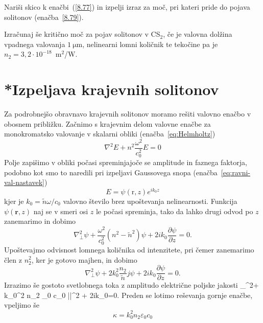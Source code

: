 \begin{definition}
Nariši skico k enačbi~(\ref{8.77}) in izpelji izraz za moč, pri kateri pride do pojava
solitonov (enačba~\ref{8.79}). 

Izračunaj še kritično moč za pojav solitonov v CS$_{2}$,
če je valovna dolžina vpadnega valovanja $1~\si{\micro\metre}$, nelinearni lomni količnik te tekočine pa je 
 $n_{2}=3,2 \cdot 10^{-18}$~m$^{2}$/W. 
\end{definition}

\section{*Izpeljava krajevnih solitonov}
\label{chap:ks}
Za podrobnejšo obravnavo krajevnih solitonov moramo rešiti valovno 
enačbo v obosnem približku. Začnimo s krajevnim delom valovne 
enačbe za monokromatsko valovanje v skalarni obliki (enačba~\ref{eq:Helmholtz})
\begin{equation}
\nabla^{2}E+n^{2}\frac{\omega^{2}}{c_0^{2}}E=0
\label{8.80}
\end{equation}
Polje zapišimo v obliki počasi spreminjajoče se amplitude in faznega faktorja, podobno kot 
smo to naredili pri izpeljavi Gaussovega snopa (enačba~\ref{eq:ravni-val-nastavek})
\begin{equation}
E=\psi(\mathrm{r},z)e^{ik_{0}z}
\label{8.81}
\end{equation}
 kjer je $k_{0}=\tilde{n}\omega/c_0$ valovno število brez upoštevanja nelinearnosti.
Funkcija $\psi(\mathbf{r},z)$ naj se v smeri osi $z$ le počasi spreminja, tako da lahko
drugi odvod po $z$ zanemarimo in dobimo 
\begin{equation}
\nabla_{\bot}^{2}\psi+\frac{\omega^{2}}{c_0^{2}}(n^{2}-\tilde{n}^{2})\psi+2ik_{0}
\frac{\partial\psi}{\partial z}=0.
\label{8.82}
\end{equation}
Upoštevajmo odvisnost lomnega količnika od intenzitete, pri čemer
zanemarimo člen z $n_{2}^{2}$, ker je gotovo majhen, in dobimo
\begin{equation}
\nabla_{\bot}^{2}\psi+2k_{0}^{2}\frac{n_{2}}{\tilde{n}}j\psi+2ik_{0}\frac{\partial\psi}{\partial z}=0.
\label{8.83}
\end{equation}
Izrazimo še gostoto svetlobnega toka z amplitudo električne poljske jakosti 
\beq
\nabla_{\bot}^{2}\psi+
k_{0}^{2} n_2 \varepsilon_0 c_0 |\psi|^2 \psi+
2ik_{0}=0.
\label{8.83a}
\eeq
Preden se lotimo reševanja gornje enačbe, vpeljimo še
\begin{equation}
\kappa=k_{0}^{2} n_2 \varepsilon_0 c_0
\end{equation}
